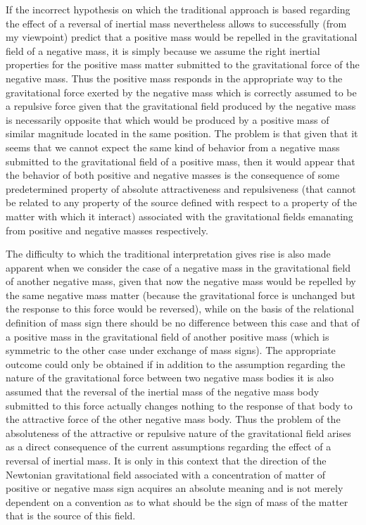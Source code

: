 \documentclass[notitlepage,12pt]{report}
\begin{document}
If the incorrect hypothesis on which the traditional approach is based regarding the effect of a reversal of inertial mass nevertheless allows to successfully (from my viewpoint) predict that a positive mass would be repelled in the gravitational field of a negative mass, it is simply because we assume the right inertial properties for the positive mass matter submitted to the gravitational force of the negative mass. Thus the positive mass responds in the appropriate way to the gravitational force exerted by the negative mass which is correctly assumed to be a repulsive force given that the gravitational field produced by the negative mass is necessarily opposite that which would be produced by a positive mass of similar magnitude located in the same position. The problem is that given that it seems that we cannot expect the same kind of behavior from a negative mass submitted to the gravitational field of a positive mass, then it would appear that the behavior of both positive and negative masses is the consequence of some predetermined property of absolute attractiveness and repulsiveness (that cannot be related to any property of the source defined with respect to a property of the matter with which it interact) associated with the gravitational fields emanating from positive and negative masses respectively.

The difficulty to which the traditional interpretation gives rise is also made apparent when we consider the case of a negative mass in the gravitational field of another negative mass, given that now the negative mass would be repelled by the same negative mass matter (because the gravitational force is unchanged but the response to this force would be reversed), while on the basis of the relational definition of mass sign there should be no difference between this case and that of a positive mass in the gravitational field of another positive mass (which is symmetric to the other case under exchange of mass signs). The appropriate outcome could only be obtained if in addition to the assumption regarding the nature of the gravitational force between two negative mass bodies it is also assumed that the reversal of the inertial mass of the negative mass body submitted to this force actually changes nothing to the response of that body to the attractive force of the other negative mass body. Thus the problem of the absoluteness of the attractive or repulsive nature of the gravitational field arises as a direct consequence of the current assumptions regarding the effect of a reversal of inertial mass. It is only in this context that the direction of the Newtonian gravitational field associated with a concentration of matter of positive or negative mass sign acquires an absolute meaning and is not merely dependent on a convention as to what should be the sign of mass of the matter that is the source of this field.
\end{document}
